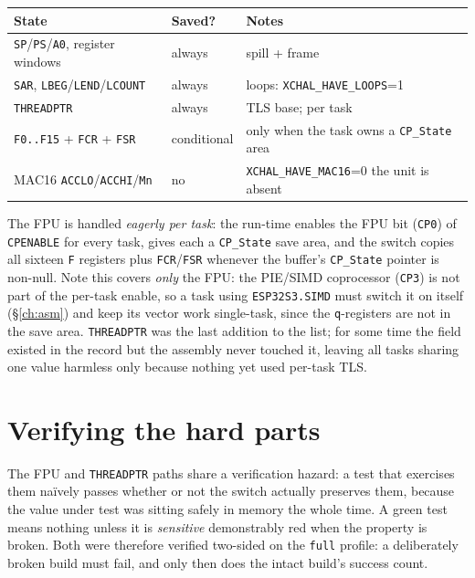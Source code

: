 \begin{longtable}{p{5.5cm} p{2.2cm} p{5.5cm}}
\toprule
\textbf{State} & \textbf{Saved?} & \textbf{Notes} \\ \midrule
\endhead
\texttt{SP}/\texttt{PS}/\texttt{A0}, register windows & always & spill + frame \\
\texttt{SAR}, \texttt{LBEG}/\texttt{LEND}/\texttt{LCOUNT} & always & loops: \texttt{XCHAL\_HAVE\_LOOPS}=1 \\
\texttt{THREADPTR} & always & TLS base; per task \\
\texttt{F0..F15} + \texttt{FCR} + \texttt{FSR} & conditional & only when the task owns a \texttt{CP\_State} area \\
MAC16 \texttt{ACCLO}/\texttt{ACCHI}/\texttt{Mn} & no & \texttt{XCHAL\_HAVE\_MAC16}=0 \textemdash{} the unit is absent \\
\bottomrule
\end{longtable}

The FPU is handled \emph{eagerly per task}: the run-time enables the FPU bit
(\texttt{CP0}) of \texttt{CPENABLE} for every task, gives each a \texttt{CP\_State}
save area, and the switch copies all sixteen \texttt{F} registers plus
\texttt{FCR}/\texttt{FSR} whenever the buffer's \texttt{CP\_State} pointer is
non-null. Note this covers \emph{only} the FPU: the PIE/SIMD coprocessor
(\texttt{CP3}) is not part of the per-task enable, so a task using
\texttt{ESP32S3.SIMD} must switch it on itself (\S\ref{ch:asm}) and keep its vector
work single-task, since the \texttt{q}-registers are not in the save area. \texttt{THREADPTR} was the last addition to
the list; for some time the field existed in the record but the assembly never
touched it, leaving all tasks sharing one value \textemdash{} harmless only because
nothing yet used per-task TLS.

\section{Verifying the hard parts}

The FPU and \texttt{THREADPTR} paths share a verification hazard: a test that
exercises them na\"ively passes whether or not the switch actually preserves them,
because the value under test was sitting safely in memory the whole time. A green
test means nothing unless it is \emph{sensitive} \textemdash{} demonstrably red
when the property is broken. Both were therefore verified two-sided on the
\texttt{full} profile: a deliberately broken build must fail, and only then does
the intact build's success count.

